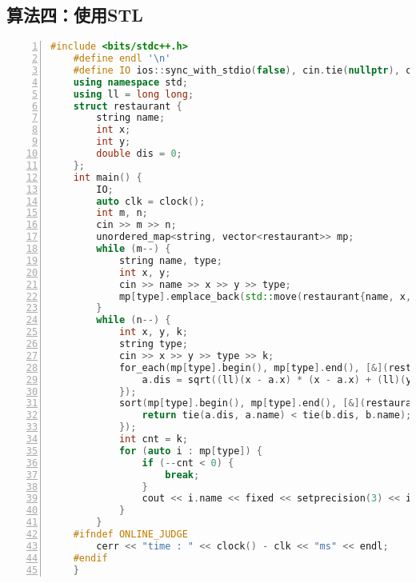 \documentclass{article}
\begin{document}
    \subsection{算法四：使用STL}
    \begin{lstlisting}[xleftmargin = 2em,xrightmargin = 2em, aboveskip = 0.5em, numbers = left, language = C++]
    #include <bits/stdc++.h>
    #define endl '\n'
    #define IO ios::sync_with_stdio(false), cin.tie(nullptr), cout.tie(nullptr)
    using namespace std;
    using ll = long long;
    struct restaurant {
        string name;
        int x;
        int y;
        double dis = 0;
    };
    int main() {
        IO;
        auto clk = clock();
        int m, n;
        cin >> m >> n;
        unordered_map<string, vector<restaurant>> mp;
        while (m--) {
            string name, type;
            int x, y;
            cin >> name >> x >> y >> type;
            mp[type].emplace_back(std::move(restaurant{name, x, y}));
        }
        while (n--) {
            int x, y, k;
            string type;
            cin >> x >> y >> type >> k;
            for_each(mp[type].begin(), mp[type].end(), [&](restaurant& a) {
                a.dis = sqrt((ll)(x - a.x) * (x - a.x) + (ll)(y - a.y) * (y - a.y));
            });
            sort(mp[type].begin(), mp[type].end(), [&](restaurant& a, restaurant& b) {
                return tie(a.dis, a.name) < tie(b.dis, b.name);
            });
            int cnt = k;
            for (auto i : mp[type]) {
                if (--cnt < 0) {
                    break;
                }
                cout << i.name << fixed << setprecision(3) << i.dis << endl;
            }
        }
    #ifndef ONLINE_JUDGE
        cerr << "time : " << clock() - clk << "ms" << endl;
    #endif
    }
    \end{lstlisting}
\end{document}
